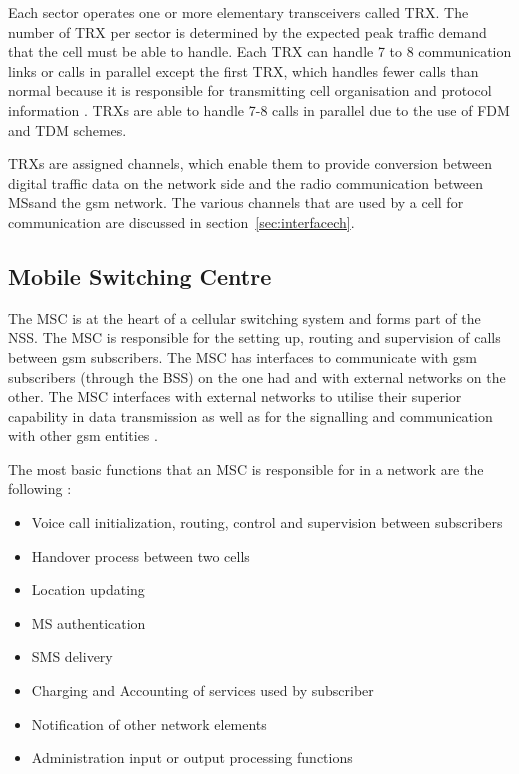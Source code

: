 Each sector operates one or more elementary transceivers called \gls{TRX}. The number of \gls{TRX} per sector is determined by the expected peak traffic demand that the cell must be able to handle. Each \gls{TRX} can handle 7 to 8 communication links or calls in parallel except the first \gls{TRX}, which handles fewer calls than normal because it is responsible for transmitting cell organisation and protocol information \cite{Eisenblatter}. \glspl{TRX} are able to handle 7-8 calls in parallel due to the use of \gls{FDM} and \gls{TDM} schemes. 

\glspl{TRX} are assigned channels, which enable them to provide conversion between digital traffic data on the network side and the radio communication between \glspl{MS}and the \gls{gsm} network\cite{ACOvsEA,FAPOrientationModel}. The various channels that are used by a cell for communication are discussed in section~\ref{sec:interfacech}.

\subsection{Mobile Switching Centre}

The \gls{MSC} is at the heart of a cellular switching system and forms part of the \gls{NSS}. The \gls{MSC} is responsible for the setting up, routing and supervision of calls between \gls{gsm} subscribers\cite{GSM92,GSMSysEngin}. The \gls{MSC} has interfaces to communicate with \gls{gsm} subscribers (through the \gls{BSS}) on the one had and with external networks on the other\cite{GSM92}. The \gls{MSC} interfaces with external networks to utilise their superior capability in data transmission as well as for the signalling and communication with other \gls{gsm} entities \cite{GSM92}. 

The most basic functions that an \gls{MSC} is responsible for in a network are the following \cite{wirelesstelcoMullet}:
\begin{itemize}
\item Voice call initialization, routing, control and supervision between subscribers
\item Handover process between two cells
\item Location updating
\item \gls{MS} authentication
\item SMS delivery
\item Charging and Accounting of services used by subscriber
\item Notification of other network elements
\item Administration input or output processing functions
\end{itemize}

